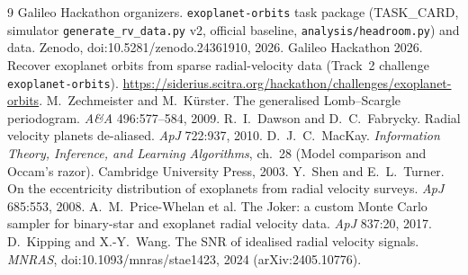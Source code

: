 \documentclass{article}
\begin{document}
\clearpage
\begin{thebibliography}{9}
 Galileo Hackathon organizers. \texttt{exoplanet-orbits} task package (TASK\_CARD, simulator
\texttt{generate\_rv\_data.py} v2, official baseline, \texttt{analysis/headroom.py}) and data. Zenodo,
doi:10.5281/zenodo.24361910, 2026.
 Galileo Hackathon 2026. Recover exoplanet orbits from
sparse radial-velocity data (Track~2 challenge \texttt{exoplanet-orbits}).
\url{https://siderius.scitra.org/hackathon/challenges/exoplanet-orbits}.
 M.~Zechmeister and M.~K\"urster. The generalised
Lomb--Scargle periodogram. \emph{A\&A} 496:577--584, 2009.
 R.~I.~Dawson and D.~C.~Fabrycky. Radial velocity planets de-aliased. \emph{ApJ} 722:937, 2010.
 D.~J.~C.~MacKay. \emph{Information Theory, Inference, and Learning Algorithms}, ch.~28
(Model comparison and Occam's razor). Cambridge University Press, 2003.
 Y.~Shen and E.~L.~Turner. On the eccentricity distribution of exoplanets from radial velocity
surveys. \emph{ApJ} 685:553, 2008.
 A.~M.~Price-Whelan et al. The Joker: a custom Monte Carlo sampler for binary-star and
exoplanet radial velocity data. \emph{ApJ} 837:20, 2017.
 D.~Kipping and X.-Y.~Wang. The SNR of idealised radial velocity signals. \emph{MNRAS}, doi:10.1093/mnras/stae1423, 2024 (arXiv:2405.10776).
\end{thebibliography}
\end{document}
